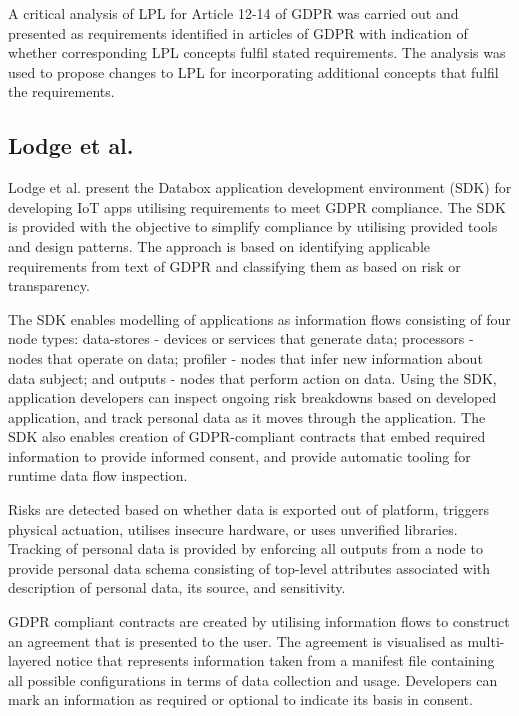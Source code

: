 A critical analysis of LPL for Article 12-14 of GDPR was carried out \cite{gerl_critical_2018} and presented as requirements identified in articles of GDPR with indication of whether corresponding LPL concepts fulfil stated requirements.
The analysis was used to propose changes to LPL for incorporating additional concepts that fulfil the requirements.

\subsection*{Lodge et al.}
Lodge et al. \cite{garcia-alfaro_developing_2018} present the Databox application development environment (SDK) for developing IoT apps utilising requirements to meet GDPR compliance. The SDK is provided with the objective to simplify compliance by utilising provided tools and design patterns.
The approach is based on identifying applicable requirements from text of GDPR and classifying them as based on risk or transparency.

The SDK enables modelling of applications as information flows consisting of four node types: data-stores - devices or services that generate data; processors - nodes that operate on data; profiler - nodes that infer new information about data subject; and outputs - nodes that perform action on data. Using the SDK, application developers can inspect ongoing risk breakdowns based on developed application, and track personal data as it moves through the application. The SDK also enables creation of GDPR-compliant contracts that embed required information to provide informed consent, and provide automatic tooling for runtime data flow inspection.

Risks are detected based on whether data is exported out of platform, triggers physical actuation, utilises insecure hardware, or uses unverified libraries. Tracking of personal data is provided by enforcing all outputs from a node to provide personal data schema consisting of top-level attributes associated with description of personal data, its source, and sensitivity.

GDPR compliant contracts are created by utilising information flows to construct an agreement that is presented to the user. The agreement is visualised as multi-layered notice that represents information taken from a manifest file containing all possible configurations in terms of data collection and usage. Developers can mark an information as required or optional to indicate its basis in consent.

